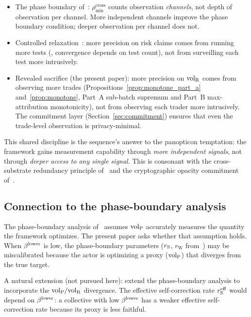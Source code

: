 \begin{itemize}
\item The phase boundary
  of~\citep[Theorem~2]{lasser2026phase}: $\rho_{\min}^{\mathrm{cross}}$
  counts observation \emph{channels}, not depth of observation per
  channel.  More independent channels improve the phase boundary
  condition; deeper observation per channel does not.
\item Controlled relaxation~\citep{lasser2026wamura}: more
  precision on risk claims comes from running more tests
  (\citealp[Theorem~2]{lasser2026wamura}, convergence depends on
  test count), not from surveilling each test more intrusively.
\item Revealed sacrifice (the present paper): more precision on
  ${\operatorname{vol}_{\mathrm{R}}}$ comes from observing more trades
  (Propositions~\ref{prop:monotone_part_a} and~\ref{prop:monotone},
  Part~A sub-batch supremum and Part~B max-attribution
  monotonicity), not from observing each trader more
  intrusively.  The commitment
  layer (Section~\ref{sec:commitment}) ensures that even the
  trade-level observation is privacy-minimal.
\end{itemize}

This shared discipline is the sequence's answer to the panopticon
temptation: the framework gains measurement capability through
\emph{more independent signals}, not through \emph{deeper access
to any single signal}.  This is consonant with the cross-substrate
redundancy principle
of~\citep[Theorem~2]{lasser2026phase} and the cryptographic
opacity commitment of~\citep[Definition~6]{lasser2026exo}.

\subsection{Connection to the phase-boundary analysis}

The phase-boundary analysis
of~\citep{lasser2026phase} assumes ${\operatorname{vol}_{\mathrm{P}}}$ accurately measures the
quantity the framework optimizes.  The present paper asks whether
that assumption holds.  When $\beta^{\mathrm{lower}}$ is low, the phase-boundary
parameters ($r_{\mathrm{S}}$, $r_{\mathrm{W}}$
from~\citep[Theorem~1]{lasser2026phase}) may be miscalibrated
because the actor is optimizing a proxy (${\operatorname{vol}_{\mathrm{P}}}$) that diverges
from the true target.

A natural extension (not pursued here): extend the phase-boundary
analysis to incorporate the ${\operatorname{vol}_{\mathrm{P}}}/{\operatorname{vol}_{\mathrm{R}}}$ divergence.  The
effective self-correction rate $r_{\mathrm{S}}^{\mathrm{eff}}$ would depend
on $\beta^{\mathrm{lower}}$: a collective with low $\beta^{\mathrm{lower}}$ has a weaker effective
self-correction rate because its proxy is less faithful.

